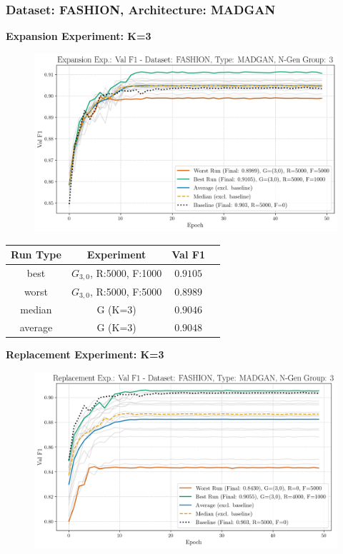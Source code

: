 \subsubsection{Dataset: FASHION, Architecture: MADGAN}
\noindent\textbf{Expansion Experiment: K=3}
\begin{figure}[htbp]
	\centering
	\includegraphics[width=.85\textwidth]{abb/strat_classifier_performance/FASHION_STRATIFIED_CLASSIFIERS_MADGAN_NEW/expansion_experiments/val_f1_score_MADGAN_FASHION_n_gen_3_all.png}
	\label{fig:app_strat_class_performance_expansion_exp._val_f1_score_3}
\end{figure}
\begin{table}[H]
	\vspace{-1em}
	\centering
	\begin{tabular}{|c|c|c|c|}
		\hline
		Run Type & Experiment & Val F1 \\ \hline
		best & \(G_{3, 0}\), R:5000, F:1000 & $0.9105$\\ \hline
		worst & \(G_{3, 0}\), R:5000, F:5000 & $0.8989$\\ \hline
		median & G (K=3) & $0.9046$\\ \hline
		average & G (K=3) & $0.9048$
		\\ \hline
	\end{tabular}
\end{table}
\noindent\textbf{Replacement Experiment: K=3}
\begin{figure}[htbp]
	\centering
	\includegraphics[width=.85\textwidth]{abb/strat_classifier_performance/FASHION_STRATIFIED_CLASSIFIERS_MADGAN_NEW/replacement_experiments/val_f1_score_MADGAN_FASHION_n_gen_3_all.png}
	\label{fig:app_strat_class_performance_replacement_exp._val_f1_score_3}
\end{figure}
